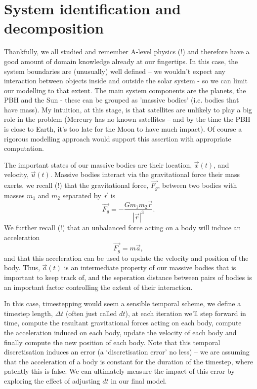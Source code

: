 \section{System identification and decomposition}

Thankfully, we all studied and remember A-level physics (!) and therefore
have a good amount of domain knowledge already at our fingertips. In this case, 
the system boundaries are (unusually) well defined -- we wouldn't expect any
interaction between objects inside and outside the solar system - so we can 
limit our modelling to that extent. The main system components are the planets,
the PBH and the Sun - these can be grouped as 'massive bodies' (i.e. bodies that
have mass). My intuition, at this stage, is that satellites are unlikely to play
a big role in the problem (Mercury has no known satellites -- and by the time
the PBH is close to Earth, it's too late for the Moon to have much impact). Of
course a rigorous modelling approach would support this assertion with appropriate
computation.

The important states of our massive bodies are their location, $\vec{x}(t)$, and 
velocity, $\vec{u}(t)$. Massive bodies interact via the gravitational force their
mass exerts, we recall (!) that the gravitational force, $\vec{F_{g}}$, between
two bodies with masses $m_1$ and $m_2$ separated by $\vec{r}$ is
\begin{equation}
\vec{F_{g}} = - \frac{G m_1 m_2 \vec{r}}{|\vec{r}|^3}.
\end{equation}
We further recall (!) that an unbalanced force acting on a body will induce an
acceleration
\begin{equation}
\vec{F_{g}} = m \vec{a},
\end{equation}
and that this acceleration can be used to update the velocity and position of
the body. Thus, $\vec{a}(t)$ is an intermediate property of our massive bodies 
that is important to keep track of, and the seperation distance between pairs
of bodies is an important factor controlling the extent of their interaction.

In this case, timestepping would seem a sensible temporal scheme, we define a
timestep length, $\Delta t$ (often just called $dt$), at each iteration we'll
step forward in time, compute the resultant gravitational forces acting on
each body, compute the acceleration induced on each body, update the velocity
of each body and finally compute the new position of each body. Note that this
temporal discretisation induces an error (a `discretisation error' no less) --
we are assuming that the acceleration of a body is constant for the duration of
the timestep, where patently this is false. We can ultimately measure the impact
of this error by exploring the effect of adjusting $dt$ in our final model.
